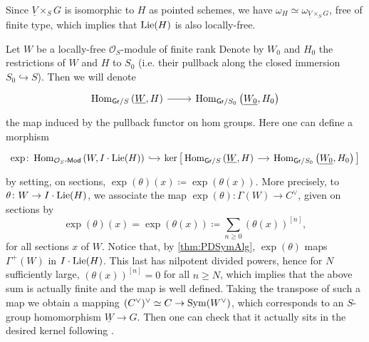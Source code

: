\begin{rem}[]
	Since $\underline{V} \times_{ S } G$ is isomorphic to $H$ as pointed
	schemes, we have $\omega_H \simeq \omega_{\underline{V} \times_S G}$, free of finite type,
	which implies that $\operatorname{Lie}(H)$ is also locally-free.
\end{rem}


\begin{defn}
	Let $W$ be a locally-free $\mathcal{O}_{ S }$-module of finite rank
	Denote by $W_0$ and $H_0$ the restrictions of $W$ and $H$ to 
	$S_0$ (i.e. their pullback along
	the closed immersion $S_0 \hookrightarrow S$).
	Then we will denote
	\begin{equation*}
	\begin{tikzcd}[row sep = 0ex
		,/tikz/column 1/.append style={anchor=base east}
		,/tikz/column 2/.append style={anchor=base west}]
		\Hom_{ \mathsf{Gr}/S } 
		\left( \underline{W}, H \right)
		\arrow[r, "", rightarrow] &
		\Hom_{ \mathsf{Gr}/S_0 }
		\left( \underline{W_0}, H_0 \right)
	\end{tikzcd}
	\end{equation*} 
	the map induced by the pullback functor on hom groups.
	Here one can define a morphism
	\begin{equation*}
	\begin{tikzcd}[row sep = 0ex, column sep = 1.22em
		,/tikz/column 1/.append style={anchor=base east}
		,/tikz/column 2/.append style={anchor=base west}]
		\exp\colon
		\Hom_{ \mathcal{O}_{ S }\text{-}\mathsf{Mod} }
		\left( W, I \cdot \lie(H) \right)
		\arrow[r, "", hookrightarrow] &
		\ker \big[ 
		\Hom_{ \mathsf{Gr}/S } 
		\left( \underline{W}, H \right)
		\arrow[r, "", rightarrow] &
		\Hom_{ \mathsf{Gr}/S_0 }
		\left( \underline{W_0}, H_0 \right)
		\big]
	\end{tikzcd}
	\end{equation*} 
	by setting, on sections,
	$\exp (\theta) (x) \coloneqq \exp \left( \theta(x) \right)$.
	More precisely, to $\theta\colon W \to I \cdot \operatorname{Lie}(H)$,
	we associate the map $\exp (\theta)\colon \Gamma(W) \to C^\vee$, given on sections by
	\begin{equation*}
		\exp (\theta) (x) =
	\exp \left( \theta(x) \right) \coloneqq
	\sum_{n\geq 0 } (\theta(x))^{[n]}
	,\end{equation*}
	for all sections $x$ of $W$.
	Notice that, by \cref{thm:PDSymAlg}, $\exp (\theta)$
	maps $\Gamma^+(W)$ in $I \cdot \operatorname{Lie}(H)$.
	This last has nilpotent divided powers, hence for $N$ sufficiently
	large, $(\theta(x))^{[n]} = 0$ for all $n \geq N$,
	which implies that the above sum is actually finite
	and the map is well defined.
	Taking the transpose of such a map we obtain a mapping 
	$(C^\vee)^\vee \simeq C \to \operatorname{Sym}(W^\vee)$, which corresponds
	to an $S$-group homomorphism $\underline{W} \to G$.
	Then one can check that it actually sits in the desired kernel
	following \cite[Chapter III, \S2.4, \S2.6]{Messing}.
\end{defn}



